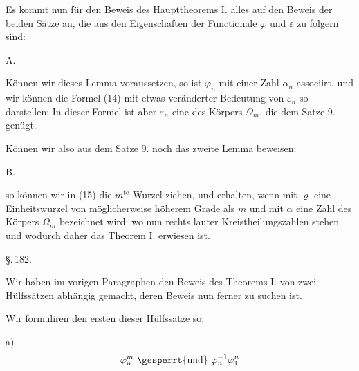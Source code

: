 
Es kommt nun f\"ur den Beweis des Haupttheorems I. alles auf den
Beweis der beiden S\"atze an, die aus den Eigenschaften der
Functionale $\varphi$ und $\varepsilon$ zu folgern sind:

A. 

K\"onnen wir dieses Lemma voraussetzen, so ist $\varphi_n$ mit
einer Zahl $\alpha_n$ associirt, und wir k\"onnen die Formel (14)
mit etwas ver\"anderter Bedeutung von $\varepsilon_n$ so
darstellen:
In dieser Formel ist aber $\varepsilon_n$ eine 
des K\"orpers $\Omega_m$, die dem Satze 9. gen\"ugt.

K\"onnen wir also aus dem Satze 9. noch das zweite Lemma
beweisen:

B. 

so k\"onnen wir in (15) die $m^{\text{te}}$ Wurzel ziehen, und
erhalten, wenn mit $\varrho$ eine Einheitswurzel von
m\"oglicherweise h\"oherem Grade als $m$ und mit $\alpha$ eine
Zahl des K\"orpers $\Omega_m$ bezeichnet wird:
wo nun rechts lauter Kreistheilungszahlen stehen und wodurch
daher das Theorem I. erwiesen ist.

\begin{center}
\S.\,182.

\end{center}

Wir haben im vorigen Paragraphen den Beweis des Theorems I. von
zwei H\"ulfss\"atzen abh\"angig gemacht, deren Beweis nun ferner
zu suchen ist.

Wir formuliren den ersten dieser H\"ulfss\"atze so:

a) 
\[
\varphi_n^m \text{ \gesperrt{und} } \varphi_n^{-1} \varphi_1^n
\]
